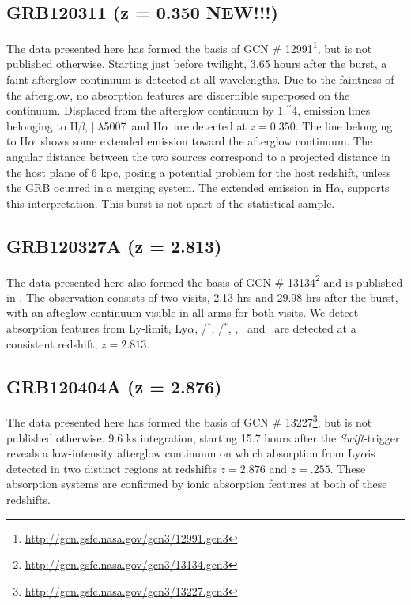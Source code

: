 \documentclass[iop, twocolappendix, numberedappendix, tighten, appendixfloats]{emulateapj}
\newcommand{\farc}{\hbox{$.\!\!^{\prime\prime}$}}
\newcommand{\lya}{Ly$\alpha$}
\newcommand{\hb}{H$\beta$}
\newcommand{\ha}{H$\alpha$}
\newcommand{\oiii}{[\ion{O}{3}]$\lambda$5007}
\newcommand{\feii}{\ion{Fe}{2}}
\newcommand{\cii}{\ion{C}{2}}
\newcommand{\mgii}{\ion{Mg}{2}}
\newcommand{\ali}{\ion{Al}{1}}
\newcommand{\SIii}{\ion{Si}{2}}
\begin{document}
	\subsection{GRB120311 (z = 0.350 NEW!!!)}
	The data presented here has formed the basis of GCN \#
	12991\footnote{\url{http://gcn.gsfc.nasa.gov/gcn3/12991.gcn3}}, but is not
	published otherwise. Starting just before twilight, 3.65 hours after the burst,
	a faint afterglow continuum is detected at all wavelengths. Due to the
	faintness of the afterglow, no absorption features are discernible superposed
	on the continuum. Displaced from the afterglow continuum by 1\farc4, emission
	lines belonging to \hb, \oiii~and \ha~are detected at $z = 0.350$. The line
	belonging to \ha~shows some extended emission toward the afterglow continuum.
	The angular distance between the two sources correspond to a projected distance
	in the host plane of 6 kpc, posing a potential problem for the host redshift,
	unless the GRB ocurred in a merging system. The extended emission in \ha,
	supports this interpretation. This burst is not apart of the statistical sample.

	\subsection{GRB120327A (z = 2.813)}
	The data presented here also formed the basis of GCN \#
	13134\footnote{\url{http://gcn.gsfc.nasa.gov/gcn3/13134.gcn3}} and is published
	in \citet{DElia2014}. The observation consists of two visits, 2.13 hrs and
	29.98 hrs after the burst, with an afteglow continuum visible in all arms for
	both visits. We detect absorption features from Ly-limit, \lya, \cii/\cii$^*$,
	\SIii/\SIii$^*$, \ali, \feii ~and \mgii ~are detected at a consistent redshift,
	$z = 2.813$.

	\subsection{GRB120404A (z = 2.876)}
	The data presented here has formed the basis of GCN \#
	13227\footnote{\url{http://gcn.gsfc.nasa.gov/gcn3/13227.gcn3}}, but is not
	published otherwise. 9.6 ks integration, starting 15.7 hours after the
	\textit{Swift}-trigger reveals a low-intensity afterglow continuum on which
	absorption from \lya is detected in two distinct regions at redshifts $z=2.876$
	and $z=.255$. These absorption systems are confirmed by ionic absorption
	features at both of these redshifts.

	
\end{document}
